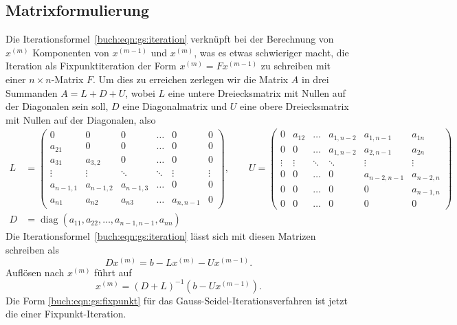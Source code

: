 \subsection{Matrixformulierung
\label{buch:subsection:matrixformulierung}}
Die Iterationsformel~\eqref{buch:eqn:gs:iteration} verknüpft bei der
Berechnung von $x^{(m)}$ Komponenten von $x^{(m-1)}$ und $x^{(m)}$,
was es etwas schwieriger macht, die Iteration als Fixpunktiteration
der Form $x^{(m)} = Fx^{(m-1)}$ zu schreiben mit einer $n\times n$-Matrix $F$.
Um dies zu erreichen zerlegen wir die Matrix $A$ in drei Summanden
$A=L+D+U$, wobei $L$ eine untere Dreiecksmatrix mit Nullen auf der 
Diagonalen sein soll, $D$ eine Diagonalmatrix und $U$ eine obere
Dreiecksmatrix mit  Nullen auf der Diagonalen, also
\begin{align*}
L
&=
\begin{pmatrix}
0        &0        &0        &\dots   & 0         & 0      \\
a_{21}   &0        &0        &\dots   & 0         & 0      \\
a_{31}   &a_{3,2}  &0        &\dots   & 0         & 0      \\
\vdots   &\vdots   &\ddots   &\ddots  & \vdots    & \vdots \\
a_{n-1,1}&a_{n-1,2}&a_{n-1,3}&\dots   & 0         & 0      \\
a_{n1}   &a_{n2}   &a_{n3}   &\dots   & a_{n,n-1} & 0
\end{pmatrix},
\qquad
U
=
\begin{pmatrix}
0      & a_{12} & \dots  & a_{1,n-2} & a_{1,n-1}   & a_{1n} \\
0      & 0      & \dots  & a_{1,n-2} & a_{2,n-1}   & a_{2n} \\
\vdots & \vdots & \ddots & \ddots    &\vdots       & \vdots \\
0      & 0      & \dots  & 0         & a_{n-2,n-1} & a_{n-2,n} \\
0      & 0      & \dots  & 0         & 0           & a_{n-1,n} \\
0      & 0      & \dots  & 0         & 0           & 0
\end{pmatrix}
\\
D
&=
\operatorname{diag} (a_{11}, a_{22},\dots , a_{n-1,n-1}, a_{nn})
\end{align*}
Die Iterationsformel~\eqref{buch:eqn:gs:iteration} lässt sich
mit diesen Matrizen schreiben als
\[
Dx^{(m)} = b - Lx^{(m)} - Ux^{(m-1)}.
\]
Auflösen nach $x^{(m)}$ führt auf
\begin{equation}
x^{(m)} = (D+L)^{-1} ( b - Ux^{(m-1)} ).
\label{buch:eqn:gs:fixpunkt}
\end{equation}
Die Form \eqref{buch:eqn:gs:fixpunkt} für das Gauss-Seidel-Iterationsverfahren
ist jetzt die einer Fixpunkt-Iteration.

